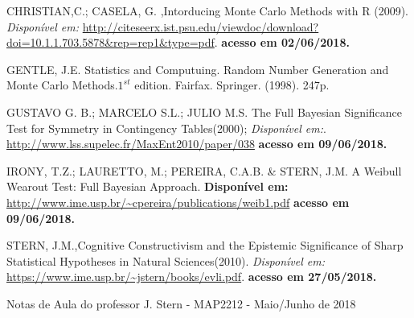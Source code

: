 \documentclass{article} %
\begin{document}
\begin{thebibliography}{refs} %
	
        CHRISTIAN,C.; CASELA, G. ,Intorducing Monte Carlo Methods with R (2009).
        \textit{Disponível em:}
        \url{http://citeseerx.ist.psu.edu/viewdoc/download?doi=10.1.1.703.5878&rep=rep1&type=pdf}.
        \textbf {acesso em 02/06/2018.}

		GENTLE, J.E. Statistics and Computuing. Random Number Generation and Monte Carlo Methods.$1^{st}$ edition. Fairfax. Springer. (1998). 247p.
        
		GUSTAVO G. B.; MARCELO S.L.; JULIO M.S. The Full Bayesian Significance Test for Symmetry in Contingency Tables(2000);
        \textit{Disponível em:}.
        \url{http://www.lss.supelec.fr/MaxEnt2010/paper/038}
        \textbf {acesso em 09/06/2018.}
        
		IRONY, T.Z.; LAURETTO, M.; PEREIRA, C.A.B. \& STERN, J.M. A Weibull Wearout Test: Full Bayesian Approach.
		\textbf{Disponível em:} 				 	 			
    	\url{http://www.ime.usp.br/\~cpereira/publications/weib1.pdf} 
		\textbf{acesso em 09/06/2018.}

        STERN, J.M.,Cognitive Constructivism and the Epistemic Significance of Sharp Statistical Hypotheses in Natural Sciences(2010).
        \textit{Disponível em:}
        \url{https://www.ime.usp.br/~jstern/books/evli.pdf}.
        \textbf {acesso em 27/05/2018.}
        
        Notas de Aula do professor J. Stern - MAP2212 - Maio/Junho de 2018     
        
\end{thebibliography}
	
\end{document}
